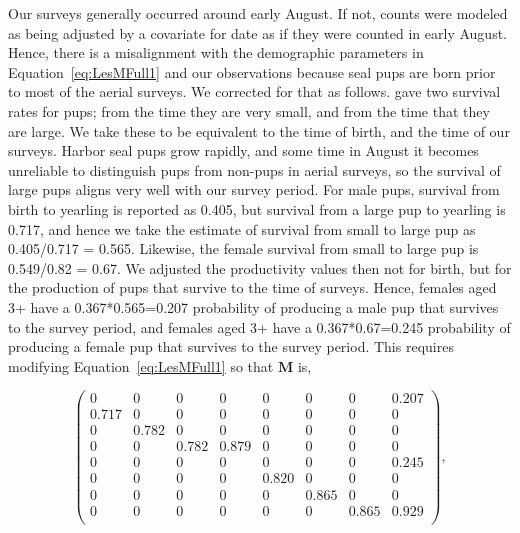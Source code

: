 \documentclass[]{risa}\usepackage[]{graphicx}\usepackage[]{color}
\def\bM{\mathbf{M}}
\begin{document}
Our surveys generally occurred around early August.  If not, counts were modeled as being adjusted by a covariate for date as if they were counted in early August.  Hence, there is a misalignment with the demographic parameters in Equation~\ref{eq:LesMFull1} and our observations because seal pups are born prior to most of the aerial surveys.  We corrected for that as follows.   gave two survival rates for pups; from the time they are very small, and from the time that they are large.  We take these to be equivalent to the time of birth, and the time of our surveys.  Harbor seal pups grow rapidly, and some time in August it becomes unreliable to distinguish pups from non-pups in aerial surveys, so the survival of large pups aligns very well with our survey period.  For male pups, survival from birth to yearling is reported as 0.405, but survival from a large pup to yearling is 0.717, and hence we take the estimate of survival from small to large pup as 0.405/0.717 = 0.565.  Likewise, the female survival from small to large pup is 0.549/0.82 = 0.67.  We adjusted the productivity values then not for birth, but for the production of pups that survive to the time of surveys.  Hence, females aged 3+ have a 0.367*0.565=0.207 probability of producing a male pup that survives to the survey period, and females aged 3+ have a 0.367*0.67=0.245 probability of producing a female pup that survives to the survey period.  This requires modifying Equation~\ref{eq:LesMFull1} so that $\bM$ is,

\begin{equation} \label{eq:LesMFull2}
   \left( \begin{smallmatrix} 
 0 & 0 & 0 & 0 & 0 & 0 & 0 & 0.207 \\ 
  0.717 & 0 & 0 & 0 & 0 & 0 & 0 & 0 \\ 
  0 & 0.782 & 0 & 0 & 0 & 0 & 0 & 0 \\ 
  0 & 0 & 0.782 & 0.879 & 0 & 0 & 0 & 0 \\ 
  0 & 0 & 0 & 0 & 0 & 0 & 0 & 0.245 \\ 
  0 & 0 & 0 & 0 & 0.820 & 0 & 0 & 0 \\ 
  0 & 0 & 0 & 0 & 0 & 0.865 & 0 & 0 \\ 
  0 & 0 & 0 & 0 & 0 & 0 & 0.865 & 0.929 \\ 
  \end{smallmatrix} \right),
\end{equation}
 
\end{document}
